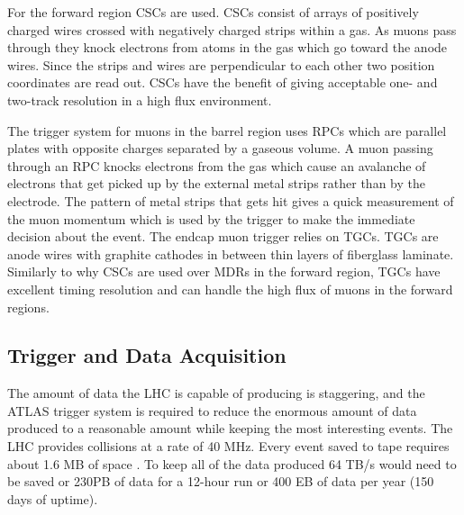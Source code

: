 For the forward region CSCs are used.  CSCs consist of arrays of positively charged wires crossed with negatively charged strips within a gas.  As muons pass through they knock electrons from atoms in the gas which go toward the anode wires. Since the strips and wires are perpendicular to each other two position coordinates are read out.  CSCs have the benefit of giving acceptable one- and two-track resolution in a high flux environment.

The trigger system for muons in the barrel region uses RPCs which are parallel plates with opposite charges separated by a gaseous volume. A muon passing through an RPC knocks electrons from the gas which cause an avalanche of electrons that get picked up by the external metal strips rather than by the electrode.  The pattern of metal strips that gets hit gives a quick measurement of the muon momentum which is used by the trigger to make the immediate decision about the event.
The endcap muon trigger relies on TGCs.  TGCs are anode wires with graphite cathodes in between thin layers of fiberglass laminate.  Similarly to why CSCs are used over MDRs in the forward region, TGCs have excellent timing resolution and can handle the high flux of muons in the forward regions.


\subsection{Trigger and Data Acquisition}
\label{sec:TDAQ}
The amount of data the LHC is capable of producing is staggering, and the ATLAS trigger system is required to reduce the enormous amount of data produced to a reasonable amount while keeping the most interesting events.  The LHC provides collisions at a rate of 40 MHz.  Every event saved to tape requires about 1.6 MB of space \cite{Outreach:1457044}. To keep all of the data produced 64 TB/s would need to be saved or 230PB of data for a 12-hour run or 400 EB of data per year (150 days of uptime). 

